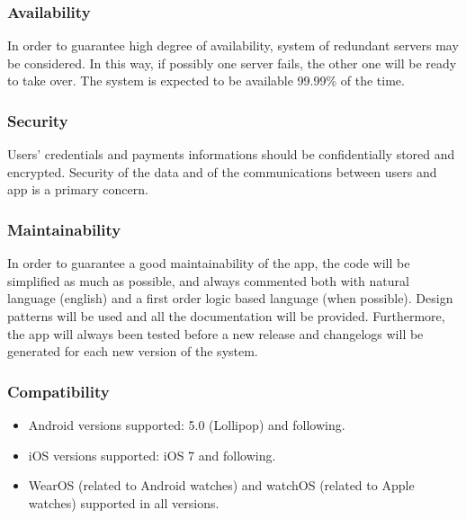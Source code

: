 \subsubsection{Availability}
In order to guarantee high degree of availability, system of redundant servers may be considered. In this way, if possibly one server fails, the other one will be ready to take over. The system is expected to be
available 99.99\% of the time.

\subsubsection{Security}
Users' credentials and payments informations should be confidentially stored and encrypted. Security of the data and of the communications between users and app is a primary concern.

\subsubsection{Maintainability}
In order to guarantee a good maintainability of the app, the code will be simplified as much as possible, and always commented both with natural language (english) and a first order logic based language (when possible). Design patterns will be used and all the documentation will be provided. Furthermore, the app will always been tested before a new release and changelogs will be generated for each new version of the system.

\subsubsection{Compatibility}
\begin{itemize}
\item Android versions supported: 5.0 (Lollipop) and following.
\item iOS versions supported: iOS 7 and following.
\item WearOS (related to Android watches) and watchOS (related to Apple watches) supported in all versions.
\end{itemize}

%